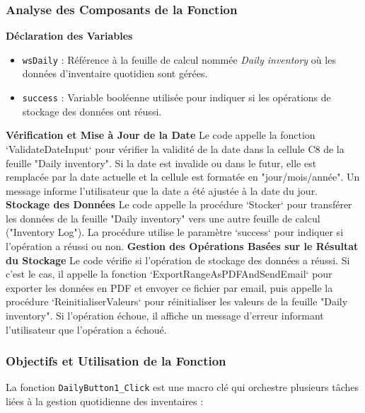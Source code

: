 \documentclass[a4paper, oneside, 12pt, final]{extreport}
\begin{document}
\subsubsection{Analyse des Composants de la Fonction}

\textbf{Déclaration des Variables}

\begin{itemize}
    \item \texttt{wsDaily} : Référence à la feuille de calcul nommée \textit{Daily inventory} où les données d'inventaire quotidien sont gérées.
    \item \texttt{success} : Variable booléenne utilisée pour indiquer si les opérations de stockage des données ont réussi.
\end{itemize}

\textbf{Vérification et Mise à Jour de la Date}
Le code appelle la fonction `ValidateDateInput` pour vérifier la validité de la date dans la cellule C8 de la feuille "Daily inventory". Si la date est invalide ou dans le futur, elle est remplacée par la date actuelle et la cellule est formatée en "jour/mois/année". Un message informe l'utilisateur que la date a été ajustée à la date du jour.
\textbf{Stockage des Données}
Le code appelle la procédure `Stocker` pour transférer les données de la feuille "Daily inventory" vers une autre feuille de calcul ("Inventory Log"). La procédure utilise le paramètre `success` pour indiquer si l'opération a réussi ou non.
\textbf{Gestion des Opérations Basées sur le Résultat du Stockage}
Le code vérifie si l'opération de stockage des données a réussi. Si c'est le cas, il appelle la fonction `ExportRangeAsPDFAndSendEmail` pour exporter les données en PDF et envoyer ce fichier par email, puis appelle la procédure `ReinitialiserValeurs` pour réinitialiser les valeurs de la feuille "Daily inventory". Si l'opération échoue, il affiche un message d'erreur informant l'utilisateur que l'opération a échoué.

\subsubsection{Objectifs et Utilisation de la Fonction}

La fonction \texttt{DailyButton1\_Click} est une macro clé qui orchestre plusieurs tâches liées à la gestion quotidienne des inventaires :
\end{document}
